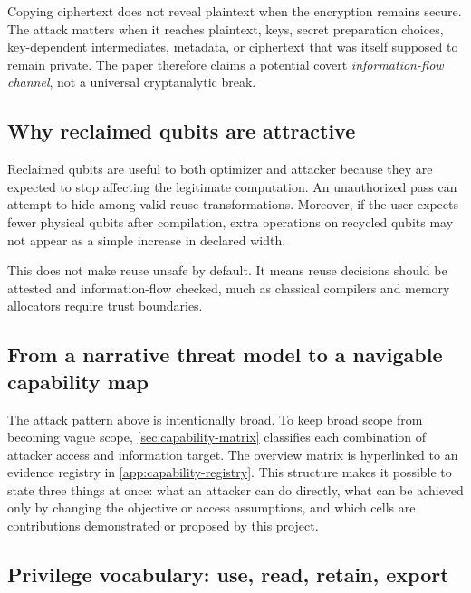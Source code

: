 \begin{cautionbox}
Copying ciphertext does not reveal plaintext when the encryption remains
secure. The attack matters when it reaches plaintext, keys, secret preparation
choices, key-dependent intermediates, metadata, or ciphertext that was itself
supposed to remain private. The paper therefore claims a potential covert
\emph{information-flow channel}, not a universal cryptanalytic break.
\end{cautionbox}

\subsection{Why reclaimed qubits are attractive}

Reclaimed qubits are useful to both optimizer and attacker because they are
expected to stop affecting the legitimate computation. An unauthorized pass can
attempt to hide among valid reuse transformations. Moreover, if the user expects
fewer physical qubits after compilation, extra operations on recycled qubits may
not appear as a simple increase in declared width.

This does not make reuse unsafe by default. It means reuse decisions should be
attested and information-flow checked, much as classical compilers and memory
allocators require trust boundaries.


\subsection{From a narrative threat model to a navigable capability map}

The attack pattern above is intentionally broad. To keep broad scope from
becoming vague scope, \cref{sec:capability-matrix} classifies each combination
of attacker access and information target. The overview matrix is hyperlinked to
an evidence registry in \cref{app:capability-registry}. This structure makes it
possible to state three things at once: what an attacker can do directly, what
can be achieved only by changing the objective or access assumptions, and which
cells are contributions demonstrated or proposed by this project.

\subsection{Privilege vocabulary: use, read, retain, export}
\label{sec:privilege-vocab}

